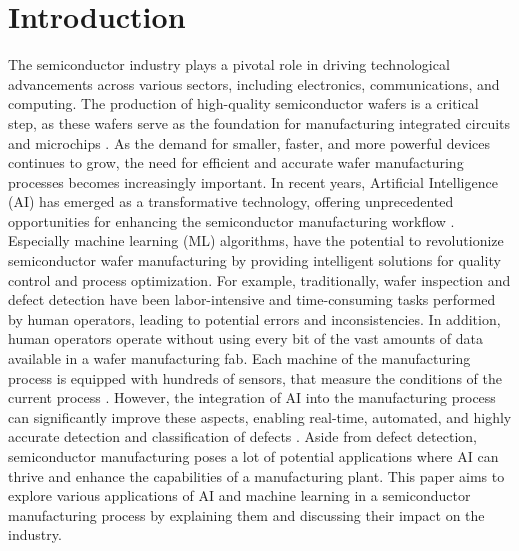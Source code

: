 \documentclass{Academic}
\begin{document}
    \myabstract{}
    \renewcommand{\myTitle}{Applications of Artificial Intelligence in Silicon / Wafer Manufacturing}
    \renewcommand{\MyAuthor}{Leon Knorr}
    \renewcommand{\MyDepartment}{Mannheim Master of Datascience}
    \renewcommand{\ID}{1902854}
    \renewcommand{\Keywords}{Manufacturing, AI, Silicon, Waver}
    \maketitle


    \section{Introduction}
    The semiconductor industry plays a pivotal role in driving technological advancements across various sectors, including electronics, communications, and computing. The production of high-quality semiconductor wafers is a critical step, as these wafers serve as the foundation for manufacturing integrated circuits and microchips \cite{batool_systematic_2021}. As the demand for smaller, faster, and more powerful devices continues to grow, the need for efficient and accurate wafer manufacturing processes becomes increasingly important. In recent years, Artificial Intelligence (AI) has emerged as a transformative technology, offering unprecedented opportunities for enhancing the semiconductor manufacturing workflow \cite{batool_systematic_2021,susto_automatic_2012}.
    Especially machine learning (ML) algorithms, have the potential to revolutionize semiconductor wafer manufacturing by providing intelligent solutions for quality control and process optimization. For example, traditionally, wafer inspection and defect detection have been labor-intensive and time-consuming tasks performed by human operators, leading to potential errors and inconsistencies. In addition, human operators operate without using every bit of the vast amounts of data available in a wafer manufacturing fab. Each machine of the manufacturing process is equipped with hundreds of sensors, that measure the conditions of the current process \cite{kim_machine_2012}. However, the integration of AI into the manufacturing process can significantly improve these aspects, enabling real-time, automated, and highly accurate detection and classification of defects \cite{yuan-fu_deep_2019-1}. Aside from defect detection, semiconductor manufacturing poses a lot of potential applications where AI can thrive and enhance the capabilities of a manufacturing plant. This paper aims to explore various applications of AI and machine learning in a semiconductor manufacturing process by explaining them and discussing their impact on the industry.
\end{document}
